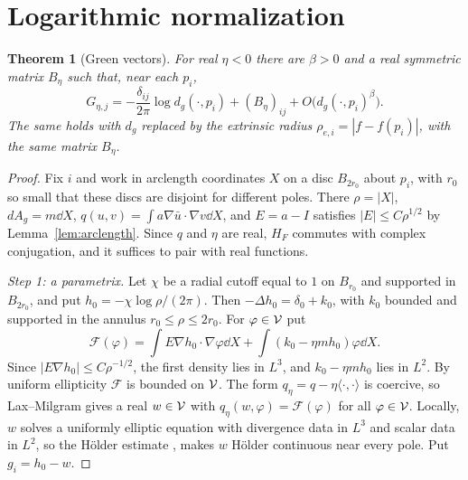 \documentclass[11pt]{article}
\newtheorem{theorem}{Theorem}[section]
\theoremstyle{definition}\newtheorem{definition}[theorem]{Definition}
\theoremstyle{remark}\newtheorem{remark}[theorem]{Remark}
\begin{document}
\section{Logarithmic normalization}\label{sec:log}
\begin{theorem}[Green vectors]\label{thm:log}
For real $\eta<0$ there are $\beta>0$ and a real symmetric matrix $B_\eta$ such
that, near each $p_i$,
\[
 G_{\eta,j}=-\frac{\delta_{ij}}{2\pi}\log d_g(\cdot,p_i)+(B_\eta)_{ij}+O\bigl(d_g(\cdot,p_i)^\beta\bigr).
\]
The same holds with $d_g$ replaced by the extrinsic radius
$\rho_{e,i}=|f-f(p_i)|$, with the same matrix $B_\eta$.
\end{theorem}
\begin{proof}
Fix $i$ and work in arclength coordinates $X$ on a disc $B_{2r_0}$ about $p_i$,
with $r_0$ so small that these discs are disjoint for different poles. There
$\rho=|X|$, $dA_g=m\dd X$, $q(u,v)=\int a\nabla\bar u\cdot\nabla v\dd X$, and
$E=a-I$ satisfies $|E|\leq C\rho^{1/2}$ by Lemma~\ref{lem:arclength}. Since $q$
and $\eta$ are real, $H_F$ commutes with complex conjugation, and it suffices
to pair with real functions.

\emph{Step 1: a parametrix.} Let $\chi$ be a radial cutoff equal to $1$ on
$B_{r_0}$ and supported in $B_{2r_0}$, and put $h_0=-\chi\log\rho/(2\pi)$. Then
$-\Delta h_0=\delta_0+k_0$, with $k_0$ bounded and supported in the annulus
$r_0\leq\rho\leq2r_0$. For $\varphi\in\mathcal V$ put
\[
 \mathcal F(\varphi)=\int E\nabla h_0\cdot\nabla\varphi\dd X+\int(k_0-\eta mh_0)\varphi\dd X .
\]
Since $|E\nabla h_0|\leq C\rho^{-1/2}$, the first density lies in $L^3$, and
$k_0-\eta mh_0$ lies in $L^2$. By uniform ellipticity $\mathcal F$ is bounded on
$\mathcal V$. The form $q_\eta=q-\eta\langle\cdot,\cdot\rangle$ is coercive, so
Lax--Milgram gives a real $w\in\mathcal V$ with $q_\eta(w,\varphi)=\mathcal F(\varphi)$
for all $\varphi\in\mathcal V$. Locally, $w$ solves a uniformly elliptic equation with
divergence data in $L^3$ and scalar data in $L^2$, so the H\"older estimate
\cite[Thm.~8.24]{gt}, \cite[Lect.~18]{simon} makes $w$ H\"older continuous near
every pole. Put $g_i=h_0-w$.


\end{proof}
\end{document}
